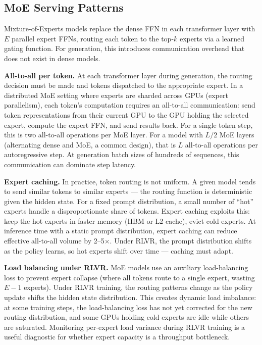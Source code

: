 \subsection{MoE Serving Patterns}

Mixture-of-Experts models replace the dense FFN in each transformer layer with $E$ parallel expert FFNs, routing each token to the top-$k$ experts via a learned gating function. For generation, this introduces communication overhead that does not exist in dense models.

\textbf{All-to-all per token.} At each transformer layer during generation, the routing decision must be made and tokens dispatched to the appropriate expert. In a distributed MoE setting where experts are sharded across GPUs (expert parallelism), each token's computation requires an all-to-all communication: send token representations from their current GPU to the GPU holding the selected expert, compute the expert FFN, and send results back. For a single token step, this is two all-to-all operations per MoE layer. For a model with $L/2$ MoE layers (alternating dense and MoE, a common design), that is $L$ all-to-all operations per autoregressive step. At generation batch sizes of hundreds of sequences, this communication can dominate step latency.

\textbf{Expert caching.} In practice, token routing is not uniform. A given model tends to send similar tokens to similar experts --- the routing function is deterministic given the hidden state. For a fixed prompt distribution, a small number of ``hot'' experts handle a disproportionate share of tokens. Expert caching exploits this: keep the hot experts in faster memory (HBM or L2 cache), evict cold experts. At inference time with a static prompt distribution, expert caching can reduce effective all-to-all volume by 2--5$\times$. Under RLVR, the prompt distribution shifts as the policy learns, so hot experts shift over time --- caching must adapt.

\textbf{Load balancing under RLVR.} MoE models use an auxiliary load-balancing loss to prevent expert collapse (where all tokens route to a single expert, wasting $E-1$ experts). Under RLVR training, the routing patterns change as the policy update shifts the hidden state distribution. This creates dynamic load imbalance: at some training steps, the load-balancing loss has not yet corrected for the new routing distribution, and some GPUs holding cold experts are idle while others are saturated. Monitoring per-expert load variance during RLVR training is a useful diagnostic for whether expert capacity is a throughput bottleneck.

